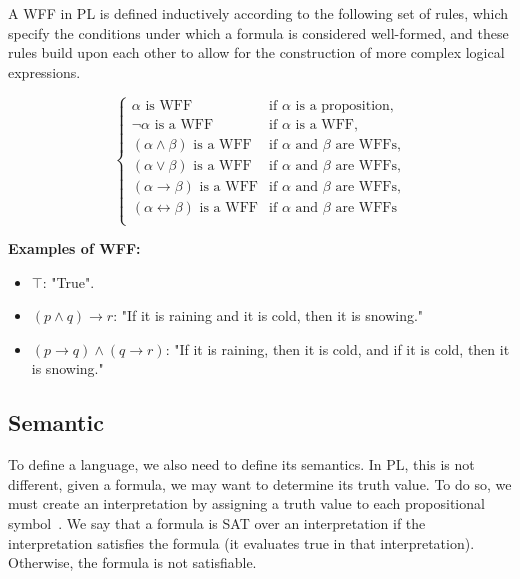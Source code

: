 A \gls{WFF} in \gls{PL} is defined inductively according to the following set of rules, which specify the conditions under which a formula is considered well-formed, and these rules build upon each other to allow for the construction of more complex logical expressions.

\[
\left\{
\begin{array}{ll}
\alpha \text{ is WFF} & \text{if } \alpha \text{ is a proposition,}\\
\neg \alpha \text{ is a WFF} & \text{if } \alpha \text{ is a WFF,}\\
(\alpha \land \beta) \text{ is a WFF} & \text{if } \alpha \text{ and } \beta \text{ are WFFs,}\\
(\alpha \lor \beta) \text{ is a WFF} & \text{if } \alpha \text{ and } \beta \text{ are WFFs,} \\
(\alpha \rightarrow \beta) \text{ is a WFF} & \text{if } \alpha \text{ and } \beta \text{ are WFFs,} \\
(\alpha \leftrightarrow \beta) \text{ is a WFF} & \text{if } \alpha \text{ and } \beta \text{ are WFFs} \\
\end{array}
\right.
\]

\textbf{Examples of WFF:}
\begin{itemize}
    \item \(\top\): "True".
    \item \((p \land q) \to r\): "If it is raining and it is cold, then it is snowing."
    \item \((p \to q) \land (q \to r)\): "If it is raining, then it is cold, and if it is cold, then it is snowing."
\end{itemize}

\subsection{Semantic}
To define a language, we also need to define its semantics. In \gls{PL}, this is not different, given a formula, we may want to determine its truth value. To do so, we must create an interpretation by assigning a truth value to each propositional symbol~\cite{gouveia_lgica}.
We say that a formula is \gls{SAT} over an interpretation if the interpretation satisfies the formula (it evaluates true in that interpretation). Otherwise, the formula is not satisfiable.

